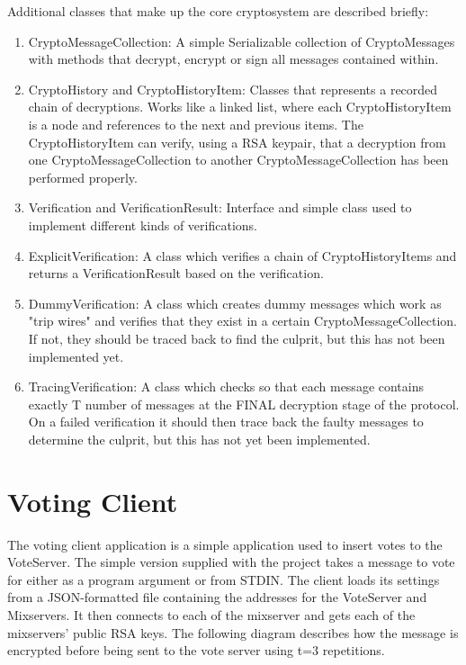 \documentclass[a4paper,11pt]{kth-mag}
\begin{document}
Additional classes that make up the core cryptosystem are described briefly:
\begin{enumerate}
	\item  CryptoMessageCollection: A simple Serializable collection of CryptoMessages with methods that decrypt, encrypt or sign all messages contained within.
	\item  CryptoHistory and CryptoHistoryItem: Classes that represents a recorded chain of decryptions. Works like a linked list, where each CryptoHistoryItem is a node and references to the next and previous items. The CryptoHistoryItem can verify, using a RSA keypair, that a decryption from one CryptoMessageCollection to another CryptoMessageCollection has been performed properly.
	\item  Verification and VerificationResult: Interface and simple class used to implement different kinds of verifications.
	\item  ExplicitVerification: A class which verifies a chain of CryptoHistoryItems and returns a VerificationResult based on the verification.
  	\item  DummyVerification: A class which creates dummy messages which work as "trip wires" and verifies that they exist in a certain CryptoMessageCollection. If not, they should be traced back to find the culprit, but this has not been implemented yet. 
	\item  TracingVerification: A class which checks so that each message contains exactly T number of messages at the FINAL decryption stage of the protocol. On a failed verification it should then trace back the faulty messages to determine the culprit, but this has not yet been implemented.
\end{enumerate}

\section{Voting Client}

The voting client application is a simple application used to insert votes to the VoteServer. The simple version supplied with the project takes a message to vote for either as a program argument or from STDIN. The client loads its settings from a JSON-formatted file containing the addresses for the VoteServer and Mixservers. It then connects to each of the mixserver and gets each of the mixservers’ public RSA keys. The following diagram describes how the message is encrypted before being sent to the vote server using t=3 repetitions.
\end{document}
